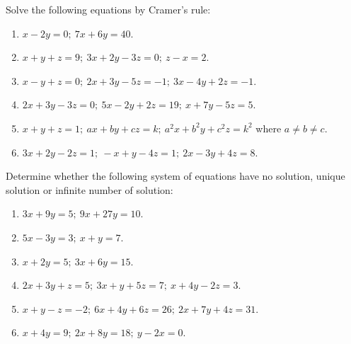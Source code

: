Solve the following equations by Cramer's rule:

\begin{enumerate}[resume]
\item $x - 2y = 0;\ 7x + 6y = 40$.
\item $x + y + z = 9;\ 3x + 2y - 3z = 0;\ z - x = 2$.
\item $x - y + z = 0;\ 2x + 3y - 5z = -1;\ 3x - 4y + 2z = -1$.
\item $2x + 3y - 3z = 0;\ 5x - 2y + 2z = 19;\ x + 7y - 5z = 5$.
\item $x + y + z = 1;\ ax + by + cz = k;\ a^2x + b^2y + c^2z = k^2$ where $a\neq b\neq c$.
\item $3x + 2y - 2z = 1;\ -x + y - 4z = 1;\ 2x - 3y + 4z = 8$.
\end{enumerate}

Determine whether the following system of equations have no solution, unique solution or infinite number of solution:

\begin{enumerate}[resume]
\item $3x + 9y = 5;\ 9x + 27y = 10$.
\item $5x - 3y = 3;\ x + y = 7$.
\item $x + 2y = 5;\ 3x + 6y = 15$.
\item $2x + 3y + z = 5;\ 3x + y + 5z = 7;\ x + 4y - 2z = 3$.
\item $x + y - z = -2;\ 6x + 4y + 6z = 26;\ 2x + 7y + 4z = 31$.
\item $x + 4y = 9;\ 2x + 8y = 18;\ y - 2x = 0$.
\end{enumerate}

